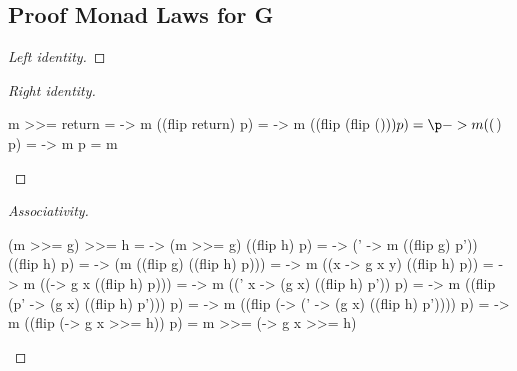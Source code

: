\documentclass[runningheads]{llncs}
\begin{document}
\subsection*{Proof Monad Laws for G}\label{G-monad-laws}
\begin{proof}[Left identity]
\end{proof}
\begin{proof}[Right identity]
\begin{haskell}
m >>= return
= \p -> m ((flip return) p)
= \p -> m ((flip (flip ($))) p)
= \p -> m (($) p)
= \p -> m p
= m
\end{haskell}
\end{proof}
\begin{proof}[Associativity]
\begin{haskell}
(m >>= g) >>= h
= \p -> (m >>= g) ((flip h) p)
= \p -> (\p' -> m ((flip g) p')) ((flip h) p)
= \p -> (m ((flip g) ((flip h) p)))
= \p -> m ((\y x -> g x y) ((flip h) p))
= \p -> m ((\x -> g x ((flip h) p)))
= \p -> m ((\p' x -> (g x) ((flip h) p')) p)
= \p -> m ((flip (\x p' -> (g x) ((flip h) p'))) p)
= \p -> m ((flip (\x -> (\p' -> (g x) ((flip h) p')))) p)
= \p -> m ((flip (\x -> g x >>= h)) p)
= m >>= (\x -> g x >>= h)
\end{haskell}
\end{proof}
\end{document}
